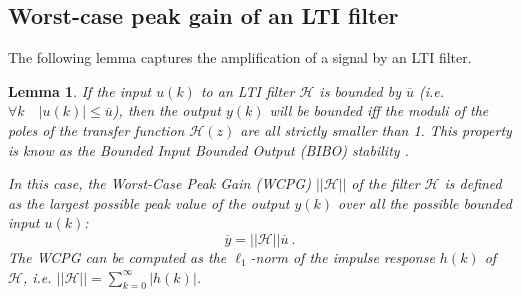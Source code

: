 \documentclass[twocolumn]{IEEEtran}
\newtheorem{lemma}{Lemma}[section]
\newcommand{\bound}[1]{\overline{#1}}
\newcommand{\wcpg}[1]{||#1||}
\begin{document}




\subsection{Worst-case peak gain of an LTI filter}
\label{sec:WCPG-def}
The following lemma captures the amplification of a signal by an LTI filter.
\begin{lemma} \label{lemma:wcpg}
If the input  $u(k)$ to an LTI filter $\mathcal{H}$ is bounded by $\bound{u}$ (\emph{i.e.} $\forall k \quad |u(k)|\leq \bound{u}$), then the output $y(k)$ will be bounded iff the moduli of the poles of the transfer function $\mathcal{H}(z)$ are all strictly smaller than 1. This property is know as the Bounded Input Bounded Output (BIBO) stability \cite{Kail80}.

In this case, the Worst-Case Peak Gain (WCPG) $\wcpg{\mathcal{H}}$ of the filter $\mathcal{H}$ is defined as the largest possible peak value of the output $y(k)$ over all the possible bounded input $u(k)$:
\begin{equation}
	\bound{y} = \wcpg{\mathcal{H}} \bound{u} \ .
\end{equation}
The WCPG  
can be computed as the $\ell_1$-norm of the impulse response $h(k)$ of $\mathcal{H}$, \emph{i.e.} $\wcpg{\mathcal{H}}=\sum_{k=0}^{\infty}|h(k)|$.
\end{lemma}
\end{document}
